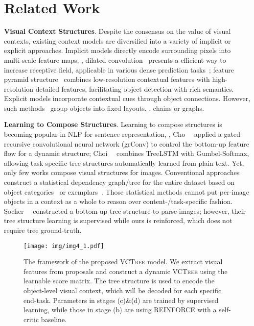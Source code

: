 \documentclass[10pt,twocolumn,letterpaper]{article}
\begin{document}
\section{Related Work}
\noindent\textbf{Visual Context Structures}. Despite the consensus on the value of visual contexts, existing context models are diversified into a variety of implicit or explicit approaches. Implicit models directly encode surrounding pixels into multi-scale feature maps, \eg, dilated convolution~\cite{yu2015multi} presents a efficient way to increase receptive field, applicable in various dense prediction tasks~\cite{chen2018deeplab, chen2017rethinking}; feature pyramid structure~\cite{lin2017feature} combines low-resolution contextual features with high-resolution detailed features, facilitating object detection with rich semantics. Explicit models incorporate contextual cues through object connections. However, such methods~\cite{li2018factorizable, xu2017scene, zellers2017neural} group objects into fixed layouts, \ie, chains or graphs.





\noindent\textbf{Learning to Compose Structures}. Learning to compose structures is becoming popular in NLP for sentence representation, \eg, Cho~\etal~\cite{cho2014properties} applied a gated recursive convolutional neural network (grConv) to control the bottom-up feature flow for a dynamic structure; Choi~\etal~\cite{choi2018learning} combines TreeLSTM with Gumbel-Softmax, allowing task-specific tree structures automatically learned from plain text. Yet, only few works compose visual structures for images. Conventional approaches construct a statistical dependency graph/tree for the entire dataset based on object categories~\cite{choi2012tree} or exemplars~\cite{malisiewicz2009beyond}. Those statistical methods cannot put per-image objects in a context as a whole to reason over content-/task-specific fashion. Socher~\etal~\cite{socher2011parsing} constructed a bottom-up tree structure to parse images; however, their tree structure learning is supervised while ours is reinforced, which does not require tree ground-truth. 



\begin{figure*}[t]
   \begin{minipage}[b]{1.0\linewidth}
   \centerline{\texttt{[image: img/img4\_1.pdf]}}
   \end{minipage}
   \caption{The framework of the proposed \textsc{VCTree} model. We extract visual features from proposals and construct a dynamic \textsc{VCTree} using the learnable score matrix. The tree structure is used to encode the object-level visual context, which will be decoded for each specific end-task. Parameters in stages (c)\&(d) are trained by supervised learning, while those in stage (b) are using REINFORCE with a self-critic baseline.}
   \vspace{-0.1in}
  \label{fig:2} \end{figure*}
\end{document}
